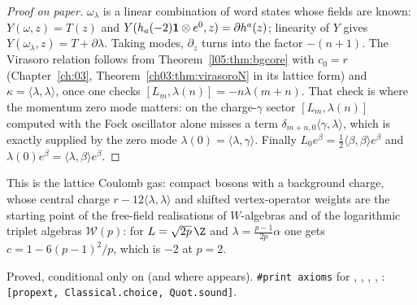 \begin{proof}[Proof on paper]
$\omega_\lambda$ is a linear combination of word states whose fields are known: $Y(\omega,z)=T(z)$ and
$Y(h_a(-2)\mathbf{1}\otimes e^0,z)=\partial h^a(z)$; linearity of $Y$ gives $Y(\omega_\lambda,z)=T+\partial\lambda$. Taking modes,
$\partial_z$ turns into the factor $-(n+1)$. The Virasoro relation follows from Theorem~\ref{l05:thm:bgcore} with $c_0=r$
(Chapter~\ref{ch:03}, Theorem~\ref{ch03:thm:virasoroN} in its lattice form) and $\kappa=\langle\lambda,\lambda\rangle$, once one
checks $[L_m,\lambda(n)]=-n\lambda(m+n)$. That check is where the momentum zero mode matters: on the charge-$\gamma$ sector
$[L_m,\lambda(n)]$ computed with the Fock oscillator alone misses a term $\delta_{m+n,0}\langle\gamma,\lambda\rangle$, which is
exactly supplied by the zero mode $\lambda(0)=\langle\lambda,\gamma\rangle$. Finally $L_0e^\beta=\frac12\langle\beta,\beta\rangle e^\beta$ and
$\lambda(0)e^\beta=\langle\lambda,\beta\rangle e^\beta$.
\end{proof}

\begin{physics}
This is the lattice Coulomb gas: compact bosons with a background charge, whose central charge
$r-12\langle\lambda,\lambda\rangle$ and shifted vertex-operator weights are the starting point of the free-field realisations of
$W$-algebras and of the logarithmic triplet algebras $\mathcal W(p)$: for $L=\sqrt{2p}\,\Z$ and
$\lambda=\frac{p-1}{2p}\alpha$ one gets $c=1-6(p-1)^2/p$, which is $-2$ at $p=2$.
\end{physics}

\begin{status}
Proved, conditional only on  (and  where  appears).
\texttt{\#print axioms} for , , ,
, : \texttt{[propext, Classical.choice, Quot.sound]}.
\end{status}

